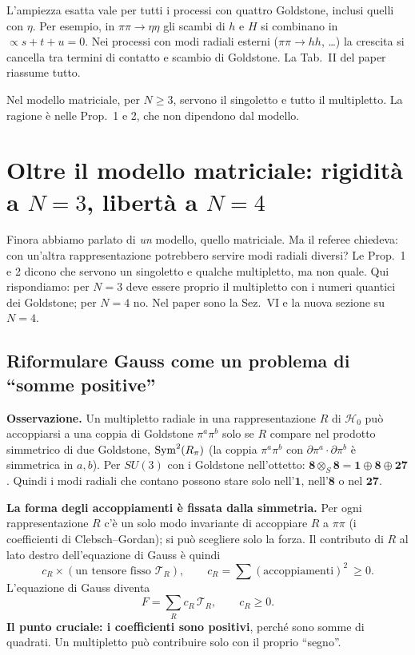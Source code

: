 \documentclass[11pt,a4paper]{article}
\numberwithin{equation}{section}
\theoremstyle{remark}
\newcommand{\Hg}{\mathcal{H}_0}
\begin{document}
L'ampiezza esatta vale per tutti i processi con quattro Goldstone, inclusi quelli con $\eta$. Per esempio, in $\pi\pi\to\eta\eta$ gli scambi di $h$ e $H$ si combinano in $\propto s+t+u=0$. Nei processi con modi radiali esterni ($\pi\pi\to hh$, \ldots) la crescita si cancella tra termini di contatto e scambio di Goldstone. La Tab.~II del paper riassume tutto.

\begin{porta}
Nel modello matriciale, per $N\ge3$, servono il singoletto e tutto il multipletto. La ragione è nelle Prop.~1 e 2, che non dipendono dal modello.
\end{porta}

\section{Oltre il modello matriciale: rigidità a $N=3$, libertà a $N=4$}
\label{cap:rigid}

\begin{dove}
Finora abbiamo parlato di \emph{un} modello, quello matriciale. Ma il referee chiedeva: con un'altra rappresentazione potrebbero servire modi radiali diversi? Le Prop.~1 e 2 dicono che servono un singoletto e qualche multipletto, ma non quale. Qui rispondiamo: per $N=3$ deve essere proprio il multipletto con i numeri quantici dei Goldstone; per $N=4$ no. Nel paper sono la Sez.~VI e la nuova sezione su $N=4$.
\end{dove}

\subsection{Riformulare Gauss come un problema di ``somme positive''}

\textbf{Osservazione.} Un multipletto radiale in una rappresentazione $R$ di $\Hg$ può accoppiarsi a una coppia di Goldstone $\pi^a\pi^b$ solo se $R$ compare nel prodotto simmetrico di due Goldstone, ${\rm Sym}^2(R_\pi)$ (la coppia $\pi^a\pi^b$ con $\partial\pi^a\cdot\partial\pi^b$ è simmetrica in $a,b$). Per $SU(3)$ con i Goldstone nell'ottetto: $\mathbf8\otimes_S\mathbf8=\mathbf1\oplus\mathbf8\oplus\mathbf{27}$. Quindi i modi radiali che contano possono stare solo nell'$\mathbf1$, nell'$\mathbf8$ o nel $\mathbf{27}$.

\textbf{La forma degli accoppiamenti è fissata dalla simmetria.} Per ogni rappresentazione $R$ c'è un solo modo invariante di accoppiare $R$ a $\pi\pi$ (i coefficienti di Clebsch--Gordan); si può scegliere solo la forza. Il contributo di $R$ al lato destro dell'equazione di Gauss è quindi
\[
c_R\times(\text{un tensore fisso }\mathcal T_R),\qquad c_R=\sum(\text{accoppiamenti})^2\ \ge0 .
\]
L'equazione di Gauss diventa
\begin{equation}
F=\sum_Rc_R\,\mathcal T_R,\qquad c_R\ge0 .
\label{eq:cone}
\end{equation}
\textbf{Il punto cruciale: i coefficienti sono positivi}, perché sono somme di quadrati. Un multipletto può contribuire solo con il proprio ``segno''.
\end{document}
